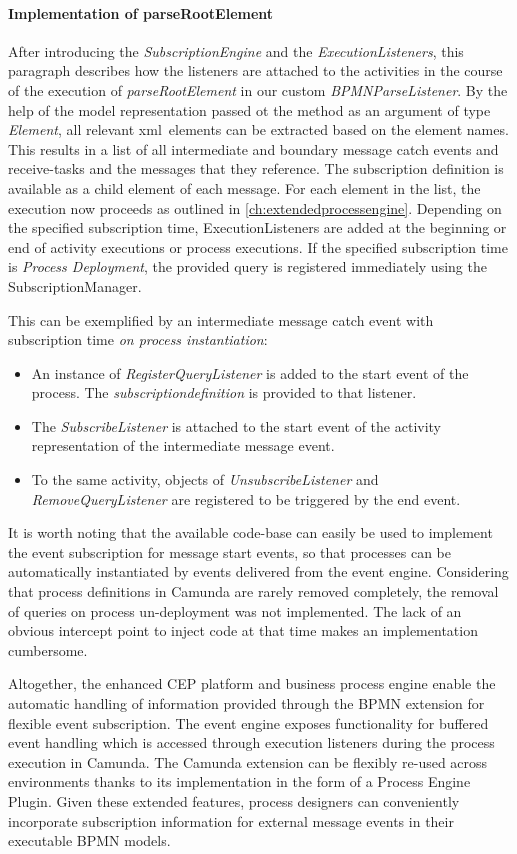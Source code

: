 \paragraph{Implementation of parseRootElement}
After introducing the \textit{SubscriptionEngine} and the \textit{ExecutionListeners}, this paragraph describes how the listeners are attached to the activities in the course of the execution of \textit{parseRootElement} in our custom \textit{BPMNParseListener}.
By the help of the model representation passed ot the method as an argument of type \textit{Element}, all relevant xml~elements can be extracted based on the element names.
This results in a list of all intermediate and boundary message catch events and receive-tasks and the messages that they reference. The subscription definition is available as a child element of each message.
For each element in the list, the execution now proceeds as outlined in \autoref{ch:extendedprocessengine}.
Depending on the specified subscription time, ExecutionListeners are added at the beginning or end of activity executions or process executions. If the specified subscription time is \textit{Process Deployment}, the provided query is registered immediately using the SubscriptionManager.

This can be exemplified by an intermediate message catch event with subscription time \textit{on process instantiation}:
\begin{itemize}
	\item An instance of \textit{RegisterQueryListener} is added to the start event of the process. The \textit{subscriptiondefinition} is provided to that listener.
	\item The \textit{SubscribeListener} is attached to the start event of the activity representation of the intermediate message event.
	\item To the same activity, objects of \textit{UnsubscribeListener} and \textit{RemoveQueryListener} are registered to be triggered by the end event.
\end{itemize}

\noindent It is worth noting that the available code-base can easily be used to implement the event subscription for message start events, so that processes can be automatically instantiated by events delivered from the event engine.
Considering that process definitions in Camunda are rarely removed completely, the removal of queries on process un-deployment was not implemented. The lack of an obvious intercept point to inject code at that time makes an implementation cumbersome.

\medskip \noindent
Altogether, the enhanced CEP platform and business process engine enable the automatic handling of information provided through the BPMN extension for flexible event subscription.
The event engine exposes functionality for buffered event handling which is accessed through execution listeners during the process execution in Camunda.
The Camunda extension can be flexibly re-used across environments thanks to its implementation in the form of a Process Engine Plugin.
Given these extended features, process designers can conveniently incorporate subscription information for external message events in their executable BPMN models.



